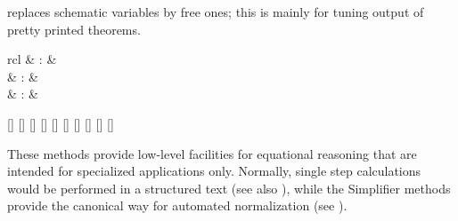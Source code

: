 \begin{isabellebody}
\begin{isamarkuptext}
\begin{description}
  \item \hyperlink{attribute.no-vars}{\mbox{}} replaces schematic variables by free
  ones; this is mainly for tuning output of pretty printed theorems.

  \end{description}%
\end{isamarkuptext}%
\isamarkuptrue%
%
\isamarkuptrue%
%
\begin{isamarkuptext}%
\begin{matharray}{rcl}
    \hypertarget{method.subst}{\hyperlink{method.subst}{\mbox{}}} & : &  \\
    \hypertarget{method.hypsubst}{\hyperlink{method.hypsubst}{\mbox{}}} & : &  \\
    \hypertarget{method.split}{\hyperlink{method.split}{\mbox{}}} & : &  \\
  \end{matharray}

  \begin{railoutput}
[]
\rail@bar
{}
[]
[]
[]
\rail@endbar
{}
\rail@bar
{}
[]
\rail@plus
{}[]
\rail@endplus
{}[]
\rail@endbar
{}[]
\rail@end
{}
[]
[]
\rail@end
\end{railoutput}


  These methods provide low-level facilities for equational reasoning
  that are intended for specialized applications only.  Normally,
  single step calculations would be performed in a structured text
  (see also ), while the Simplifier methods
  provide the canonical way for automated normalization (see
  ).

  \begin{description}


\end{description}
\end{isamarkuptext}
\end{isabellebody}
